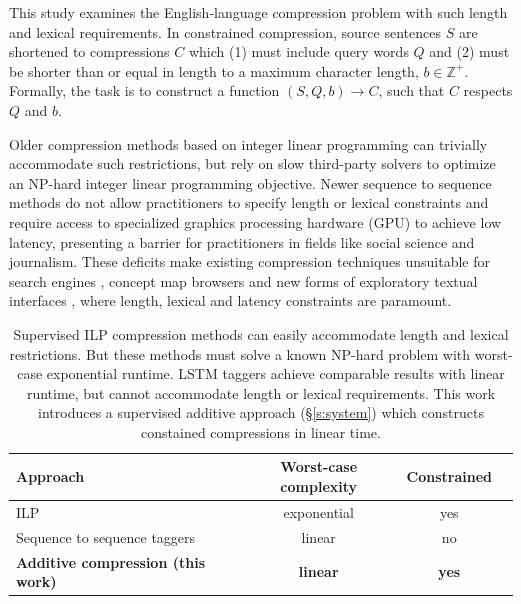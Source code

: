 \documentclass[11pt,a4paper]{article}
\begin{document}
This study examines the English-language compression problem with such length and lexical requirements. In constrained compression, source sentences $S$ are shortened to compressions $C$ which (1) must include query words $Q$ and (2) must be shorter than or equal in length to a maximum character length, $b \in \mathbb{Z}^{+}$. Formally, the task is to construct a function $(S,Q,b) \rightarrow C$, such that $C$ respects $Q$ and $b$.

Older compression methods  \cite{clarke2008global,filippova2013overcoming} based on integer linear programming can trivially accommodate such restrictions, but rely on slow third-party solvers to optimize an NP-hard integer linear programming objective\label{s:relatedwork}. Newer sequence to sequence methods \cite{filippova2015sentence} do not allow practitioners to specify length or lexical constraints and require access to specialized graphics processing hardware (GPU) to achieve low latency, presenting a barrier for practitioners in fields like social science and journalism. These deficits make existing compression techniques unsuitable for search engines \cite{hearst2009search}, concept map browsers \cite{falke2017graphdocexplore} and new forms of exploratory textual interfaces \cite{marchionini2006exploratory}, where length, lexical and latency constraints are paramount. 

\begin{table}[htb!]
\begin{tabular}{lccc}
\textbf{Approach} & \textbf{Worst-case complexity} & \textbf{Constrained}  \\ \hline
ILP    \cite{filippova2013overcoming,Wang2017CanSH}       &   exponential    & yes     \\
Sequence to sequence taggers \cite{filippova2015sentence}   & linear              & no         \\   
\textbf{Additive compression (this work)}  & \textbf{linear}     &      \textbf{yes}   
\end{tabular}
\caption{Supervised ILP compression methods \cite{clarke2008global,filippova2013overcoming,Wang2017CanSH} can easily accommodate length and lexical restrictions. But these methods must solve a known NP-hard problem with worst-case exponential runtime. LSTM taggers \cite{filippova2015sentence} achieve comparable results with linear runtime, but cannot accommodate length or lexical requirements. This work introduces a supervised additive approach (\S\ref{s:system}) which constructs constained compressions in linear time.} 
\label{t:algos}
\end{table}
\end{document}
